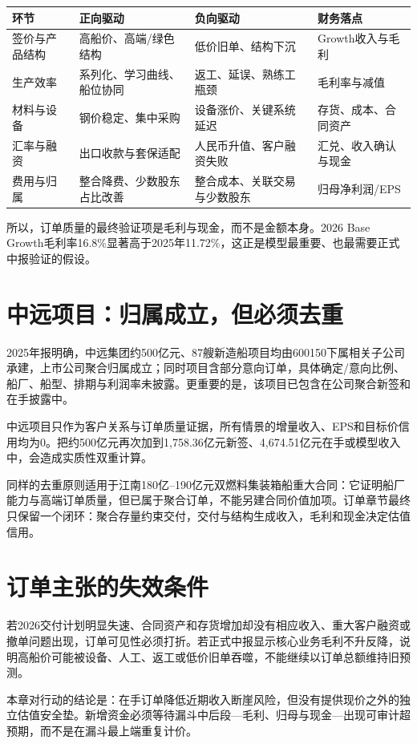 \begin{exhibitbox}[订单价格到归母净利的驱动瀑布]
\small
\begin{tabularx}{\exhibitboxwidth}{L{3.1cm}L{4.2cm}L{3.5cm}X}
\toprule
\textbf{环节} & \textbf{正向驱动} & \textbf{负向驱动} & \textbf{财务落点} \\
\midrule
签价与产品结构 & 高船价、高端/绿色结构 & 低价旧单、结构下沉 & Growth收入与毛利 \\
生产效率 & 系列化、学习曲线、船位协同 & 返工、延误、熟练工瓶颈 & 毛利率与减值 \\
材料与设备 & 钢价稳定、集中采购 & 设备涨价、关键系统延迟 & 存货、成本、合同资产 \\
汇率与融资 & 出口收款与套保适配 & 人民币升值、客户融资失败 & 汇兑、收入确认与现金 \\
费用与归属 & 整合降费、少数股东占比改善 & 整合成本、关联交易与少数股东 & 归母净利润/EPS \\
\bottomrule
\end{tabularx}
\end{exhibitbox}

所以，订单质量的最终验证项是毛利与现金，而不是金额本身。2026 Base Growth毛利率16.8\%显著高于2025年11.72\%，这正是模型最重要、也最需要正式中报验证的假设。

\section{中远项目：归属成立，但必须去重}

2025年报明确，中远集团约500亿元、87艘新造船项目均由600150下属相关子公司承建，上市公司聚合归属成立；同时项目含部分意向订单，具体确定/意向比例、船厂、船型、排期与利润率未披露。更重要的是，该项目已包含在公司聚合新签和在手披露中。

\begin{riskbox}[禁止重复叠加]
中远项目只作为客户关系与订单质量证据，所有情景的增量收入、EPS和目标价信用均为0。把约500亿元再次加到1,758.36亿元新签、4,674.51亿元在手或模型收入中，会造成实质性双重计算。
\end{riskbox}

同样的去重原则适用于江南180亿--190亿元双燃料集装箱船重大合同：它证明船厂能力与高端订单质量，但已属于聚合订单，不能另建合同价值加项。订单章节最终只保留一个闭环：聚合存量约束交付，交付与结构生成收入，毛利和现金决定估值信用。

\section{订单主张的失效条件}

若2026交付计划明显失速、合同资产和存货增加却没有相应收入、重大客户融资或撤单问题出现，订单可见性必须打折。若正式中报显示核心业务毛利不升反降，说明高船价可能被设备、人工、返工或低价旧单吞噬，不能继续以订单总额维持旧预测。

本章对行动的结论是：在手订单降低近期收入断崖风险，但没有提供现价之外的独立估值安全垫。新增资金必须等待漏斗中后段---毛利、归母与现金---出现可审计超预期，而不是在漏斗最上端重复计价。
